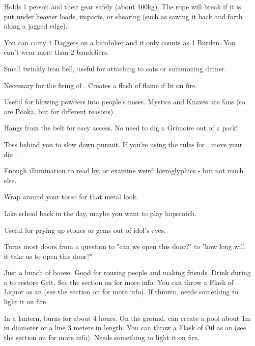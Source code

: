 \newpage

\begin{multicols}{2}


   Holds 1 person and their gear safely (about 100kg). The rope will break if it is put under heavier loads, impacts, or shearing (such as sawing it back and forth along a jagged edge).
  
   You can carry 4 Daggers on a bandolier and it only counts as 1 Burden. You can't wear more than 2 bandoliers.
  
   Small twinkly iron bell, useful for attaching to cats or summoning dinner.

   Necessary for the firing of . Creates a flash of flame if lit on fire.  

   Useful for blowing powders into people's noses.  Mystics and Knaves are fans (so are Pooka, but for different reasons).
  
    Hangs from the belt for easy access.  No need to dig a Grimoire out of a pack!

    Toss behind you to slow down pursuit. If you're using the rules for , move your die \DCUP.

   Enough illumination to read by, or examine weird hieroglyphics - but not much else.

   Wrap around your torso for that metal look.

   Like school back in the day, maybe you want to play hopscotch.

   Useful for prying up stones or gems out of idol's eyes.

   Turns most doors from a question to "can we open this door?" to "how long will it take us to open this door?"
  
   Just a bunch of booze. Good for rousing people and making friends. Drink during a  to restore Grit. See the section on  for more info. You can throw a Flask of Liquor as an  (see the section on  for more info). If thrown, needs something to light it on fire.

   In a lantern, burns for about 4 hours. On the ground, can create a pool about 1m in diameter or a line 3 meters in length. You can throw a Flask of Oil as an  (see the section on  for more info). Needs something to light it on fire.



\end{multicols}
